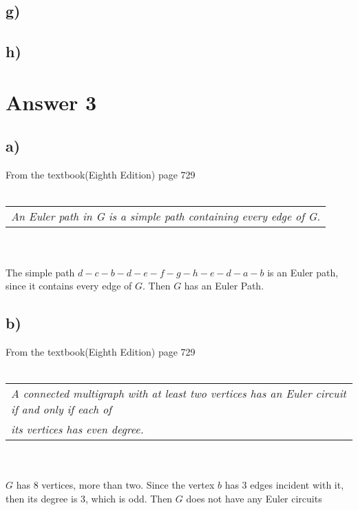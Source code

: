 \documentclass[11pt]{article}
\newcommand{\scale}[0] {2}
\begin{document}
\subsection*{g)}
\begin{figure}[H]
\end{figure}
\subsection*{h)}

\section*{Answer 3}
\subsection*{a)}
From the textbook(Eighth Edition) page 729
\\ \\
\begin{tabular}{l}
    \textit{An Euler path in G is a simple path containing every edge of G.}   
\end{tabular}
\\ \\
The simple path $d-c-b-d-e-f-g-h-e-d-a-b$ is an Euler path, since it contains every edge of $G$.
Then $G$ has an Euler Path.
\subsection*{b)}
From the textbook(Eighth Edition) page 729
\\ \\
\begin{tabular}{l}
    \textit{A connected multigraph with at least two vertices has an Euler circuit if and only if each of} \\
    \textit{its vertices has even degree.}   
\end{tabular}
\\ \\
$G$ has $8$ vertices, more than two. Since the vertex $b$ has $3$ edges incident with it, then its degree is
$3$, which is odd. Then $G$ does not have any Euler circuits 
\end{document}
